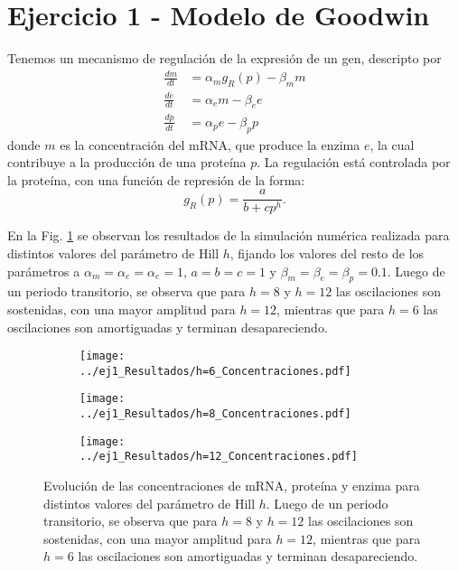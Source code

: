 \section*{Ejercicio 1 - Modelo de Goodwin}

Tenemos un mecanismo de regulación de la expresión de un gen, descripto por
\begin{align}
    \frac{dm}{dt} &= \alpha_m g_{R}\left(p\right) - \beta_m m \\
    \frac{de}{dt} &= \alpha_e m - \beta_e e \\
    \frac{dp}{dt} &= \alpha_p e - \beta_p p
\end{align}
donde $m$ es la concentración del mRNA, que produce la enzima $e$, la cual contribuye a la producción de una proteína $p$. La regulación está controlada por la proteína, con una función de represión de la forma:
\begin{equation}
    g_R \left(p\right) = \frac{a}{b+cp^{h}}.
    \label{eq:represion}
\end{equation}

En la Fig. \ref{ej1:concentraciones_barrido_h} se observan los resultados de la simulación numérica realizada para distintos valores del parámetro de Hill $h$, fijando los valores del resto de los parámetros a $\alpha_m = \alpha_e = \alpha_e =1$, $a=b=c=1$ y $\beta_m = \beta_e = \beta_p = 0.1$. Luego de un periodo transitorio, se observa que para $h=8$ y $h=12$ las oscilaciones son sostenidas, con una mayor amplitud para $h=12$, mientras que para $h=6$ las oscilaciones son amortiguadas y terminan desapareciendo.

\begin{figure}[htb!]
    \centering
    \begin{subfigure}[b]{0.42\textwidth}
        \texttt{[image: ../ej1\_Resultados/h=6\_Concentraciones.pdf]}
    \end{subfigure}
    \begin{subfigure}[b]{0.42\textwidth}
        \texttt{[image: ../ej1\_Resultados/h=8\_Concentraciones.pdf]}
    \end{subfigure}
    \begin{subfigure}[b]{0.42\textwidth}
        \texttt{[image: ../ej1\_Resultados/h=12\_Concentraciones.pdf]}
    \end{subfigure}
    \caption{Evolución de las concentraciones de mRNA, proteína y enzima para distintos valores del parámetro de Hill $h$. Luego de un periodo transitorio, se observa que para $h=8$ y $h=12$ las oscilaciones son sostenidas, con una mayor amplitud para $h=12$, mientras que para $h=6$ las oscilaciones son amortiguadas y terminan desapareciendo.}
    \label{ej1:concentraciones_barrido_h}
\end{figure}

